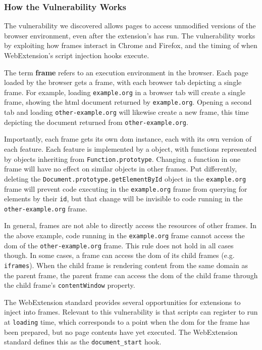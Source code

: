 \subsubsection{How the Vulnerability Works}
The vulnerability we discovered allows pages to access unmodified versions
of the browser environment, even after the extension's \JS has run.  The
vulnerability works by exploiting how frames interact in Chrome and Firefox,
and the timing of when WebExtension's script injection hooks execute.


The term \textbf{frame} refers to an execution environment in the browser.
Each page loaded by the browser gets a frame, with each browser
tab depicting a single frame.  For example, loading \texttt{example.org} in
a browser tab will create a single frame, showing the \gls{html} document
returned by \texttt{example.org}.  Opening a second tab and loading
\texttt{other-example.org} will likewise create a new frame, this time
depicting the document returned from \texttt{other-example.org}.

Importantly, each frame gets its own \gls{dom} instance, each with its own
version of each \WAPI feature.  Each \WAPI feature is implemented by a \JS
object, with functions represented by objects inheriting from
\texttt{Function.prototype}.  Changing a function in one frame will have no
effect on similar objects in other frames.  Put differently, deleting the
\texttt{Document.prototype.getElementById} object in the \texttt{example.org}
frame will prevent code executing in the \texttt{example.org} frame from
querying for elements by their \texttt{id}, but that change will be invisible
to code running in the \texttt{other-example.org} frame.

In general, frames are not able to directly access the resources of other
frames.  In the above example, code running in the \texttt{example.org} frame
cannot access the \gls{dom} of the \texttt{other-example.org} frame.  This rule
does not hold in all cases though.  In some cases, a frame can access the
\gls{dom} of its child frames (e.g. \texttt{iframes}).  When the child frame is
rendering content from the same domain as the parent frame, the parent frame
can access the \gls{dom} of the child frame through the child frame's
\texttt{contentWindow} property.


The WebExtension standard provides several opportunities for extensions to
inject \JS into frames.  Relevant to this vulnerability is that scripts can
register to run at \texttt{loading} time, which corresponds to a point when
the \gls{dom} for the frame has been prepared, but no page contents have
yet executed. The WebExtension standard defines this as the
\texttt{document\_start} hook.

